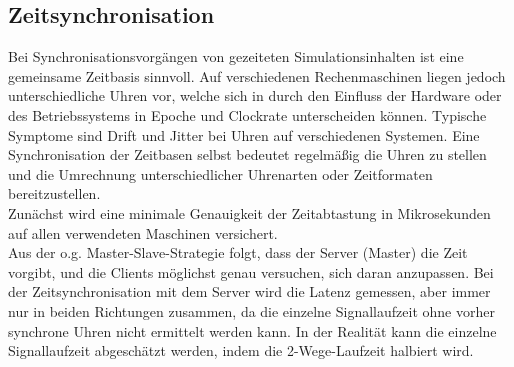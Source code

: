 \subsection{Zeitsynchronisation}

Bei Synchronisationsvorgängen von gezeiteten Simulationsinhalten ist eine gemeinsame Zeitbasis sinnvoll.
Auf verschiedenen Rechenmaschinen liegen jedoch unterschiedliche Uhren vor, welche sich
in durch den Einfluss der Hardware oder des Betriebssystems in Epoche und Clockrate unterscheiden können. Typische Symptome sind Drift und Jitter bei Uhren auf verschiedenen Systemen.
Eine Synchronisation der Zeitbasen selbst bedeutet regelmäßig die Uhren zu stellen und die Umrechnung
unterschiedlicher Uhrenarten oder Zeitformaten bereitzustellen.\\
Zunächst wird eine minimale Genauigkeit der Zeitabtastung in Mikrosekunden auf allen verwendeten Maschinen versichert.\\
Aus der o.g. Master-Slave-Strategie folgt, dass der Server (Master) die Zeit vorgibt, und die Clients möglichst genau versuchen, sich daran anzupassen. Bei der Zeitsynchronisation mit dem Server wird die Latenz gemessen, aber immer nur in beiden Richtungen zusammen, da die einzelne Signallaufzeit ohne vorher synchrone Uhren nicht ermittelt werden kann. In der Realität kann die einzelne Signallaufzeit abgeschätzt werden, indem die 2-Wege-Laufzeit halbiert wird.


